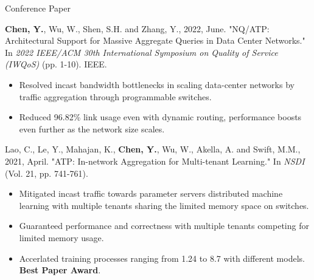 
\vspace{-2mm}

\begin{cventries}

  \cventry
    {} %
    {Conference Paper} %
    {} %
    {} %
    {
      \vspace{-2mm}
      \begin{cvitems} %
        \item {\textbf{Chen, Y.}, Wu, W., Shen, S.H. and Zhang, Y., 2022, June. "NQ/ATP: Architectural Support for Massive Aggregate Queries in Data Center Networks." 
        In \emph{2022 IEEE/ACM 30th International Symposium on Quality of Service (IWQoS)} (pp. 1-10). IEEE.
        }
        \begin{itemize}
          \item {Resolved incast bandwidth bottlenecks in scaling data-center networks by traffic aggregation through programmable switches.}
          \item {Reduced 96.82\% link usage even with dynamic routing, performance boosts even further as the network size scales.}
        \end{itemize}
        \item {Lao, C., Le, Y., Mahajan, K., \textbf{Chen, Y.}, Wu, W., Akella, A. and Swift, M.M., 2021, April. "ATP: In-network Aggregation for Multi-tenant Learning." 
        In \emph{NSDI} (Vol. 21, pp. 741-761).
        }
        \begin{itemize}
          \item{Mitigated incast traffic towards parameter servers distributed machine learning with multiple tenants sharing the limited memory space on switches.}
          \item {Guaranteed performance and correctness with multiple tenants competing for limited memory usage.}
          \item {Accerlated training processes ranging from 1.24 to 8.7 with different models. \textbf{Best Paper Award}.}
        \end{itemize}
      \end{cvitems}
    }
  \vspace{-2mm}


\end{cventries}
